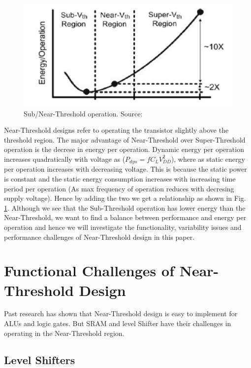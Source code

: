 \documentclass[conference]{IEEEtran}
\begin{document}
\begin{figure}[htbp]
	\includegraphics[width=\linewidth]{img/Pictures/Energy_comparison.png}
	\centering
	\caption{Sub/Near-Threshold operation. Source: \cite{b1}}
	\label{fig:Energy_comparison}
\end{figure}

Near-Threshold designs refer to operating the transistor slightly above the
threshold region. The major advantage of Near-Threshold over Super-Threshold operation is the decrese in energy per operation.
Dynamic energy per operation increases quadratically with voltage as ($P_{dyn}=fC_LV_{DD}^2$), where as static energy per operation increases with decreasing voltage. This is because the static power
is constant and the static energy consumption increases with increasing time period per operation (As max frequency of operation reduces with decresing supply voltage).
Hence by adding the two we get a relationship as shown in Fig. \ref{fig:Energy_comparison}. Although we see that the Sub-Threshold operation
has lower energy than the Near-Threshold, we want to find a balance between
performance and energy per operation and hence we will investigate the
functionality, variability issues and performance challenges of Near-Threshold
design in this paper.

\section{Functional Challenges of Near-Threshold Design}
\label{sec:Func_challenges}

Past research has shown that Near-Threshold design is easy to implement for ALUs and logic gates. But SRAM and level Shifter have their challenges in operating in the Near-Threshold region.

\subsection{Level Shifters}
\end{document}
